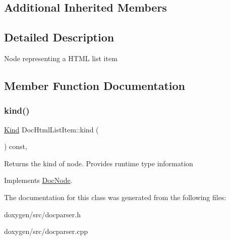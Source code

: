 \subsection*{Additional Inherited Members}


\subsection{Detailed Description}
Node representing a H\+T\+ML list item 

\subsection{Member Function Documentation}
\mbox{\label{class_doc_html_list_item_ae4c720be5343803f1a30c2cd871a7861}} 
\subsubsection{\texorpdfstring{kind()}{kind()}}
{\footnotesize\ttfamily \mbox{\hyperlink{class_doc_node_aebd16e89ca590d84cbd40543ea5faadb}{Kind}} Doc\+Html\+List\+Item\+::kind (\begin{DoxyParamCaption}{ }\end{DoxyParamCaption}) const\hspace{0.3cm}{\ttfamily [inline]}, {\ttfamily [virtual]}}

Returns the kind of node. Provides runtime type information 

Implements \mbox{\hyperlink{class_doc_node_a108ffd214a72ba6e93dac084a8f58049}{Doc\+Node}}.



The documentation for this class was generated from the following files\+:\begin{DoxyCompactItemize}
\item 
doxygen/src/docparser.\+h\item 
doxygen/src/docparser.\+cpp\end{DoxyCompactItemize}
